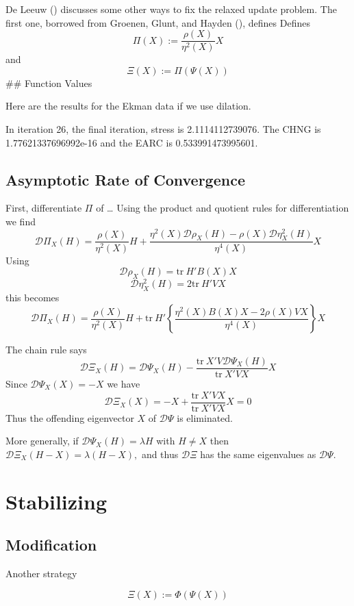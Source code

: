 \documentclass[
  12pt,
  letterpaper,
  DIV=11,
  numbers=noendperiod]{scrartcl}
\begin{document}
De Leeuw () discusses some other ways
to fix the relaxed update problem. The first one, borrowed from Groenen,
Glunt, and Hayden (),
defines Defines \[
\Pi(X):=\frac{\rho(X)}{\eta^2(X)}X
\] and \[
\Xi(X):=\Pi(\Psi(X))
\] \#\# Function Values

Here are the results for the Ekman data if we use dilation.

In iteration 26, the final iteration, stress is 2.1114112739076. The
CHNG is 1.77621337696992e-16 and the EARC is 0.533991473995601.

\subsection{Asymptotic Rate of
Convergence}\label{asymptotic-rate-of-convergence-6}

First, differentiate \(\Pi\) of \ldots{} Using the product and quotient
rules for differentiation we find \[
\mathcal{D}\Pi_X(H)=\frac{\rho(X)}{\eta^2(X)}H+\frac{\eta^2(X)\mathcal{D}\rho_X(H)-\rho(X)\mathcal{D}\eta^2_X(H)}{\eta^4(X)}X
\] Using \[
\mathcal{D}\rho_X(H)=\text{tr}\ H'B(X)X
\] \[
\mathcal{D}\eta^2_X(H)=2\text{tr}\ H'VX
\] this becomes \[
\mathcal{D}\Pi_X(H)=\frac{\rho(X)}{\eta^2(X)}H+\text{tr}\ H'\left\{\frac{\eta^2(X) B(X)X-2\rho(X)VX}{\eta^4(X)}\right\}X
\]

The chain rule says \[
\mathcal{D}\Xi_X(H)=\mathcal{D}\Psi_X(H)-\frac{\text{tr}\ X'V\mathcal{D}\Psi_X(H)}{\text{tr}\ X'VX}X
\] Since \(\mathcal{D}\Psi_X(X)=-X\) we have \[
\mathcal{D}\Xi_X(X)=-X+\frac{\text{tr}\ X'VX}{\text{tr}\ X'VX}X=0
\] Thus the offending eigenvector \(X\) of \(\mathcal{D}\Psi\) is
eliminated.

More generally, if \(\mathcal{D}\Psi_X(H)=\lambda H\) with \(H\not= X\)
then \(\mathcal{D}\Xi_X(H-X)=\lambda (H-X),\) and thus
\(\mathcal{D}\Xi\) has the same eigenvalues as \(\mathcal{D}\Psi\).

\section{Stabilizing}\label{stabilizing}

\subsection{Modification}\label{modification-6}

Another strategy

\begin{equation}
\Xi(X):=\Phi(\Psi(X))
\end{equation}
\end{document}
